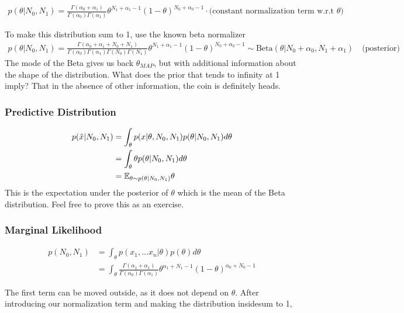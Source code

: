 \documentclass{article}
\begin{document}
\begin{align*}
p(\theta|N_0,N_1) = \frac{\Gamma(\alpha_0 + \alpha_1)}{\Gamma(\alpha_0)\Gamma(\alpha_1)} \theta^{N_1 + \alpha_1-1} (1-\theta)^{N_0 + \alpha_0-1} \cdot \textrm{(constant normalization term w.r.t $\theta$)}
\end{align*}

\noindent To make this distribution sum to 1, use the known beta normalizer
\begin{align*}
p(\theta|N_0,N_1) = \frac{\Gamma(\alpha_0 + \alpha_1 + N_0 + N_1)}{\Gamma(\alpha_0)\Gamma(\alpha_1)\Gamma(N_0)\Gamma(N_1)} \theta^{N_1 + \alpha_1-1} (1-\theta)^{N_0 + \alpha_0-1} \sim \textrm{Beta}(\theta | N_0 + \alpha_0, N_1 + \alpha_1) \quad \text{(posterior)}
\end{align*}
\noindent The mode of the Beta gives us back $\theta_{MAP}$, but with additional information about the shape of the distribution. What does the prior that tends to infinity at 1 imply? That in the absence of other information, the coin is definitely heads.

\subsubsection*{Predictive Distribution}
\begin{align*}
p(\hat{x}| N_0, N_1) &= \int_\theta p(x|\theta, N_0, N_1) p(\theta | N_0, N_1) d\theta \\
&= \int_\theta \theta p(\theta | N_0, N_1) d\theta \\
&= \mathbb{E}_{\theta \sim p(\theta|N_0, N_1)} \theta
\end{align*}
\noindent This is the expectation under the posterior of $\theta$ which is the  mean of the Beta distribution. Feel free to prove this as an exercise.

\subsubsection*{Marginal Likelihood}
\begin{align*}
p(N_0, N_1) &= \int_\theta p(x_1, \hdots x_n | \theta) p(\theta) d\theta \\
&= \int_\theta \frac{\Gamma( \alpha_1 +  \alpha_1)}{\Gamma(\alpha_0)\Gamma(\alpha_1)} \theta^{\alpha_1 + N_1 -1} (1-\theta)^{\alpha_0+N_0-1}
\end{align*}

\noindent The first term can be moved outside, as it does not depend on $\theta$. After introducing our normalization term and making the distribution insidesum to 1,
\end{document}
